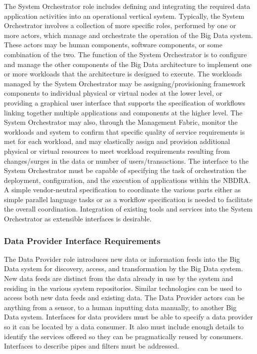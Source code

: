 \documentclass[9pt,]{article}
\begin{document}
The System Orchestrator role includes defining and integrating the
required data application activities into an operational vertical
system. Typically, the System Orchestrator involves a collection of more
specific roles, performed by one or more actors, which manage and
orchestrate the operation of the Big Data system. These actors may be
human components, software components, or some combination of the two.
The function of the System Orchestrator is to configure and manage the
other components of the Big Data architecture to implement one or more
workloads that the architecture is designed to execute. The workloads
managed by the System Orchestrator may be assigning/provisioning
framework components to individual physical or virtual nodes at the
lower level, or providing a graphical user interface that supports the
specification of workflows linking together multiple applications and
components at the higher level. The System Orchestrator may also,
through the Management Fabric, monitor the workloads and system to
confirm that specific quality of service requirements is met for each
workload, and may elastically assign and provision additional physical
or virtual resources to meet workload requirements resulting from
changes/surges in the data or number of users/transactions. The
interface to the System Orchestrator must be capable of specifying the
task of orchestration the deployment, configuration, and the execution
of applications within the NBDRA. A simple vendor-neutral specification
to coordinate the various parts either as simple parallel language tasks
or as a workflow specification is needed to facilitate the overall
coordination. Integration of existing tools and services into the System
Orchestrator as extensible interfaces is desirable.

\hypertarget{data-provider-interface-requirements}{%
\subsubsection{Data Provider Interface
Requirements}\label{data-provider-interface-requirements}}

The Data Provider role introduces new data or information feeds into the
Big Data system for discovery, access, and transformation by the Big
Data system. New data feeds are distinct from the data already in use by
the system and residing in the various system repositories. Similar
technologies can be used to access both new data feeds and existing
data. The Data Provider actors can be anything from a sensor, to a human
inputting data manually, to another Big Data system. Interfaces for data
providers must be able to specify a data provider so it can be located
by a data consumer. It also must include enough details to identify the
services offered so they can be pragmatically reused by consumers.
Interfaces to describe pipes and filters must be addressed.
\end{document}
